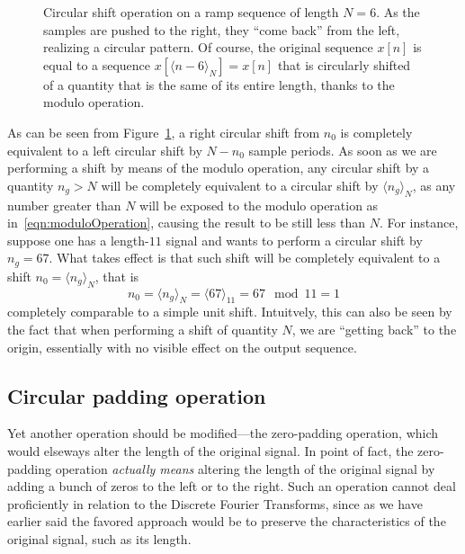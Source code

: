 \documentclass[\documentfontsize, twocolumn]{\classname}
\begin{document}
\begin{figure}[ht]
\begin{center}
\end{center}\caption{Circular shift operation on a ramp sequence of length $N = 6$. As the samples are pushed to the right, they ``come back'' from the left, realizing a circular pattern. Of course, the original sequence $x[n]$ is equal to a sequence $x[\langle n - 6\rangle_N] = x[n]$ that is circularly shifted of a quantity that is the same of its entire length, thanks to the modulo operation.}\label{tikz:circularShift}
\end{figure}

As can be seen from Figure~\ref{tikz:circularShift}, a right circular shift from $n_0$ is completely equivalent to a left circular shift by $N-n_0$ sample periods. As soon as we are performing a shift by means of the modulo operation, any circular shift by a quantity $n_g > N$ will be completely equivalent to a circular shift by $\langle n_g \rangle_N$, as any number greater than $N$ will be exposed to the modulo operation as in~\ref{eqn:moduloOperation}, causing the result to be still less than $N$. For instance, suppose one has a length-$11$ signal and wants to perform a circular shift by $n_g = 67$. What takes effect is that such shift will be completely equivalent to a shift $n_0 = \langle n_g \rangle_N$, that is
\[
    n_0 = \langle n_g \rangle_N = \langle 67 \rangle_{11} = 67 \mod 11 = 1
\]
completely comparable to a simple unit shift.
Intuitvely, this can also be seen by the fact that when performing a shift of quantity $N$, we are ``getting back'' to the origin, essentially with no visible effect on the output sequence.

\subsection{Circular padding operation}
Yet another operation should be modified---the zero-padding operation, which would elseways alter the length of the original signal. In point of fact, the zero-padding operation \emph{actually means} altering the length of the original signal by adding a bunch of zeros to the left or to the right. Such an operation cannot deal proficiently in relation to the Discrete Fourier Transforms, since as we have earlier said the favored approach would be to preserve the characteristics of the original signal, such as its length.
\end{document}
